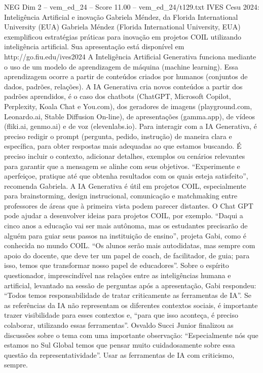 \begin{textsample}{NEG Dim 2 – vem\_ed\_24 – Score 11.00 – vem\_ed\_24/t129.txt}  \label{ex:f2_neg_153}
IVES Cesu 2024: Inteligência Artificial e inovação Gabriela Méndez, da Florida International University (EUA) Gabriela Méndez (Florida International University, EUA) exemplificou estratégias práticas para inovação em projetos COIL utilizando inteligência artificial.
Sua apresentação está disponível em http://go.fiu.edu/ives2024 A Inteligência Artificial Generativa funciona mediante o uso de um modelo de aprendizagem de máquina (machine learning).
Essa aprendizagem ocorre a partir de conteúdos criados por humanos (conjuntos de dados, padrões, relações).
A IA Generativa cria novos conteúdos a partir dos padrões aprendidos, é o caso dos chatbots (ChatGPT, Microsoft Copilot, Perplexity, Koala Chat e You.com), dos geradores de imagens (playground.com, Leonardo.ai, Stable Diffusion On-line), de apresentações (gamma.app), de vídeos (fliki.ai, genmo.ai) e de voz (elevenlabs.io).
Para interagir com a IA Generativa, é preciso redigir o prompt (pergunta, pedido, instrução) de maneira clara e específica, para obter respostas mais adequadas ao que estamos buscando.
É preciso incluir o contexto, adicionar detalhes, exemplos ou cenários relevantes para garantir que a mensagem se alinhe com seus objetivos. “Experimente e aperfeiçoe, pratique até que obtenha resultados com os quais esteja satisfeito”, recomenda Gabriela.
A IA Generativa é útil em projetos COIL, especialmente para brainstorming, design instrucional, comunicação e matchmaking entre professores de áreas que à primeira vista podem parecer distantes.
O Chat GPT pode ajudar a desenvolver ideias para projetos COIL, por exemplo. “Daqui a cinco anos a educação vai ser mais autônoma, mas os estudantes precisarão de alguém para guiar seus passos na instituição de ensino”, projeta Gabi, como é conhecida no mundo COIL. “Os alunos serão mais autodidatas, mas sempre com apoio do docente, que deve ter um papel de coach, de facilitador, de guia; para isso, temos que transformar nosso papel de educadores”.
Sobre o espírito questionador, imprescindível nas relações entre as inteligências humana e artificial, levantado na sessão de perguntas após a apresentação, Gabi respondeu: “Todos temos responsabilidade de tratar criticamente as ferramentas de IA”.
Se as referências da IA não representam os diferentes contextos sociais, é importante trazer visibilidade para esses contextos e, “para que isso aconteça, é preciso colaborar, utilizando essas ferramentas”.
Osvaldo Succi Junior finalizou as discussões sobre o tema com uma importante observação: “Especialmente nós que estamos no Sul Global temos que pensar muito cuidadosamente sobre essa questão da representatividade”.
Usar as ferramentas de IA com criticismo, sempre.

\end{textsample}

